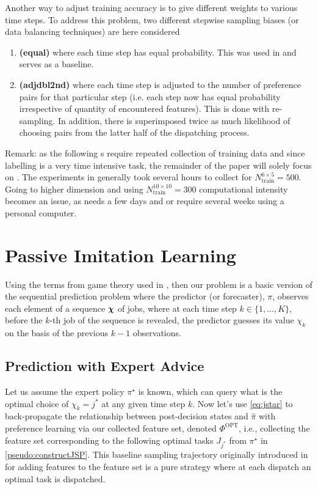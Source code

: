 \documentclass[twocolumn]{svjour3}
\begin{document}
Another way to adjust training accuracy is to give different weights to various 
time steps. To address this problem, two different stepwise sampling biases (or 
data balancing techniques) are here considered
\begin{enumerate}[after={{}}, leftmargin=*,
label={\textbf{Bias.\arabic*}}, ref={{Bias.\arabic*}}]
\item \label{bias:equal} \textbf{(equal)} where each time step has equal 
probability. This was used in \cite{InRu14,InRu15a} and serves as a baseline.
\item \label{bias:adjdbl2nd} \textbf{(adjdbl2nd)} where each time step is 
adjusted to the number of preference pairs for that particular step (i.e. 
each step now has equal probability irrespective of quantity of encountered 
features). This is done with re-sampling.
In addition, there is superimposed twice as much likelihood of 
choosing pairs from the latter half of the dispatching process. 
\end{enumerate}

\noindent Remark: as the following s require 
repeated collection of training data and since labelling is a very 
time intensive task, the remainder of the paper will solely focus 
on .
The experiments in \cite{InRu15a} generally took several hours to collect for 
$N_{\text{train}}^{6\times5}=500$. 
Going to higher dimension and using $N_{\text{train}}^{10\times10}=300$ 
computational intensity becomes an issue, as  needs a few days and 
 or  require several weeks using a personal computer.

\section{Passive Imitation Learning}\label{sec:il:passive}
Using the terms from game theory used in \cite{CesaBianchi06}, %
then our problem is a basic version of the sequential prediction problem where 
the predictor (or forecaster), $\pi$, observes each element of a sequence 
$\bm \chi$ of jobs, where at each time step $k \in \{1,...,K\}$, before the 
$k$-th job of the sequence is revealed, the predictor guesses its value 
$\chi_k$ on the basis of the previous $k-1$ observations. 

\subsection{Prediction with Expert Advice}\label{sec:expertPolicy}
Let us assume the expert policy $\pi^\star$ is known, which can query what 
is the optimal choice of $\chi_k={j^*}$ at any given time step $k$. 
Now let's use \cref{eq:jstar} to back-propagate the relationship between 
post-decision states and $\hat{\pi}$ with preference learning via our collected 
feature set, denoted $\Phi^\text{OPT}$, i.e., collecting the feature set 
corresponding to the following optimal tasks $J_{j^*}$ from $\pi^\star$ in 
\cref{pseudo:constructJSP}.
This baseline sampling trajectory originally introduced in \cite{InRu11a} for 
adding features to the feature set is a pure strategy where at each dispatch an 
optimal task is dispatched.
\end{document}
